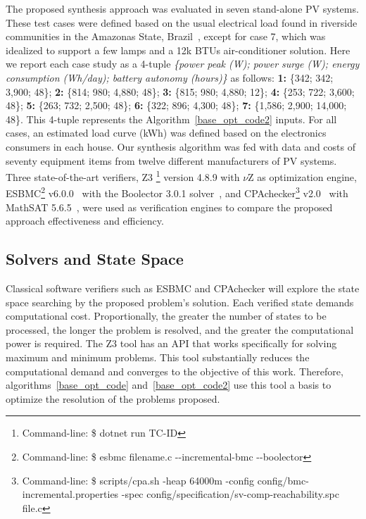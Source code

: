 \documentclass[10pt,journal,compsoc]{IEEEtran}
\begin{document}
The proposed synthesis approach was evaluated in seven stand-alone PV systems. These test cases were defined based on the usual electrical load found in riverside communities in the Amazonas State, Brazil~\cite{TrindadeCordeiro19,Agrener2013}, except for case 7, which was idealized to support a few lamps and a 12k BTUs air-conditioner solution. 
Here we report each case study as a 4-tuple \textit{\{power peak (W); power surge (W); energy consumption (Wh/day); battery autonomy (hours)\}} as follows:
  \textbf{1:} \{342; 342; 3,900; 48\}; \textbf{2:} \{814; 980; 4,880; 48\}; \textbf{3:} \{815; 980; 4,880; 12\}; \textbf{4:} \{253; 722; 3,600; 48\}; \textbf{5:} \{263; 732; 2,500; 48\}; \textbf{6:} \{322; 896; 4,300; 48\}; \textbf{7:} \{1,586; 2,900; 14,000; 48\}. This 4-tuple represents the Algorithm~\ref{base_opt_code2} inputs. For all cases, an estimated load curve (kWh) was defined based on the electronics consumers in each house. Our synthesis algorithm was fed with data and costs of seventy equipment items from twelve different manufacturers of PV systems. 
%
Three state-of-the-art verifiers, Z3 \footnote{Command-line: \$ dotnet run TC-ID} version 4.8.9 with $\nu$Z as optimization engine, ESBMC\footnote{Command-line: \$ esbmc filename.c -\phantom{}-incremental-bmc -\phantom{}-boolector} v6.0.0~\cite{esbmc2018} with the Boolector 3.0.1 solver~\cite{Brummayer}, and CPAchecker\footnote{Command-line: \$ scripts/cpa.sh -heap 64000m -config config/bmc-incremental.properties -spec config/specification/sv-comp-reachability.spc file.c} v2.0~\cite{Beyer2011} with MathSAT 5.6.5~\cite{mathsat5}, were used as verification engines to compare the proposed approach effectiveness and efficiency.  \color{black}

\subsection{Solvers and State Space}
\label{sec:SolversandStateSpace}
  Classical software verifiers such as ESBMC and CPAchecker will explore the state space searching by the proposed problem's solution. Each verified state demands computational cost. Proportionally, the greater the number of states to be processed, the longer the problem is resolved, and the greater the computational power is required. The Z3 tool has an API that works specifically for solving maximum and minimum problems. This tool substantially reduces the computational demand and converges to the objective of this work. Therefore, algorithms~\ref{base_opt_code} and~\ref{base_opt_code2} use this tool a basis to optimize the resolution of the problems proposed.
\end{document}

